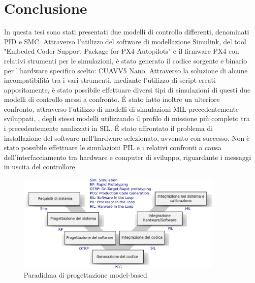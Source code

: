 \section{Conclusione}
In questa tesi sono stati presentati due modelli di controllo differenti, denominati PID e SMC. Attraverso l'utilizzo del software di modellazione Simulink, del tool "Embeded Coder Support Package for PX4 Autopilots" e il firmware PX4 con relativi strumenti per le simulazioni, è stato generato il codice sorgente e binario per l'hardware specifico scelto: CUAV\textregistered V5 Nano\textregistered. Attraverso la soluzione di alcune incompatibilità tra i vari strumenti, mediante l'utilizzo di script creati appositamente, è stato possibile effettuare diversi tipi di simulazioni di questi due modelli di controllo messi a confronto. \'E stato fatto inoltre un ulteriore confronto, attraverso l'utilizzo di modelli di simulazioni MIL precedentemente sviluppati, \cite{DesTestCarm}, degli stessi modelli utilizzando il profilo di missione più completo tra i precedentemente analizzati in SIL. \'E stato affrontato il problema di installazione del software nell'hardware selezionato, avvenuto con successo. Non è stato possibile effettuare le simulazioni PIL e i relativi confronti a causa dell'interfacciamento tra hardware e computer di sviluppo, riguardante i messaggi in uscita del controllore. 

\begin{figure}
	\centering
	\includegraphics[width=0.9\textwidth]{Simulazioni/Figure/VSHAPE}
	\caption{Paradidma di progettazione model-based}
	\label{fig:VSHAPE}
\end{figure}

